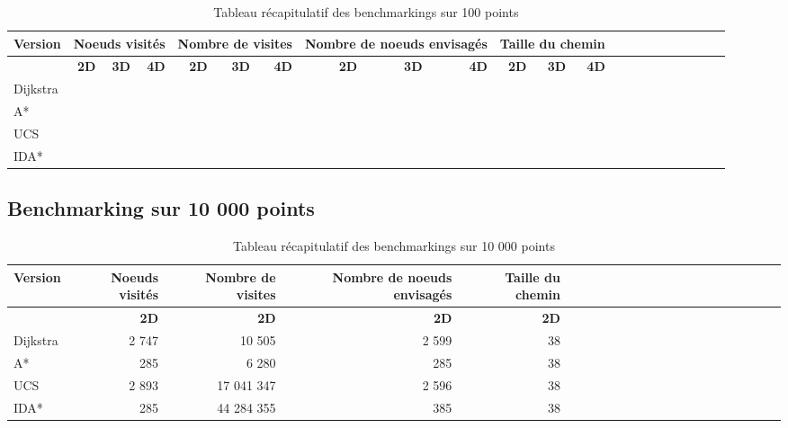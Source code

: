 \documentclass[pidr]{tnreport}
\begin{document}
\begin{table}[H]
\begin{center}
   \begin{tabular}{| l | r | r | r | r | r | r | r | r | r | r | r | r | r | r | r | r | r | r | r | r | r |}
     \hline
      \textbf{Version} & \multicolumn{3}{c|}{\textbf{Noeuds visités}} & \multicolumn{3}{c|}{\textbf{Nombre de visites}} & \multicolumn{3}{c|}{\textbf{Nombre de noeuds envisagés}} & \multicolumn{3}{c|}{\textbf{Taille du chemin}} \\
     \hline
     \cline{2-5}
    & \textbf{2D} & \textbf{3D} & \textbf{4D} & \textbf{2D} & \textbf{3D} & \textbf{4D} & \textbf{2D} & \textbf{3D} & \textbf{4D} & \textbf{2D} & \textbf{3D} & \textbf{4D}\\ \hline
     Dijkstra &  &  &  &  &  &  & & &  & & & \\ \hline
     A* &  &  &  &  &  &  &  &  &  &  &  &   \\ \hline
      UCS &  &  &  &  &  &  &  &  &  &  &  &   \\ \hline
      IDA* &  &  &  &  &  &  & & &  & & &   \\ \hline
   \end{tabular}
 \end{center}
 \caption{Tableau récapitulatif des benchmarkings sur 100 points}
\end{table}		

\subsection{Benchmarking sur 10 000 points}
		
\begin{table}[H]
\begin{center}
   \begin{tabular}{| l | r | r | r | r | r | r | r | r | r | r | r | r | r | r | r | r | r | r | r | r | r |}
     \hline
      \textbf{Version} & \textbf{Noeuds visités} & \textbf{Nombre de visites} & \textbf{Nombre de noeuds envisagés} & \textbf{Taille du chemin} \\
     \hline
     \cline{2-5}
    & \textbf{2D} & \textbf{2D} & \textbf{2D} & \textbf{2D} \\ \hline
     Dijkstra &  2 747 & 10 505 & 2 599 & 38  \\ \hline
     A* & 285 & 6 280 & 285 & 38   \\ \hline
      UCS & 2 893 & 17 041 347 & 2 596 & 38   \\ \hline
      IDA* & 285 & 44 284 355 & 385 & 38  \\ \hline
   \end{tabular}
 \end{center}
 \caption{Tableau récapitulatif des benchmarkings sur 10 000 points}
\end{table}
		
\end{document}
